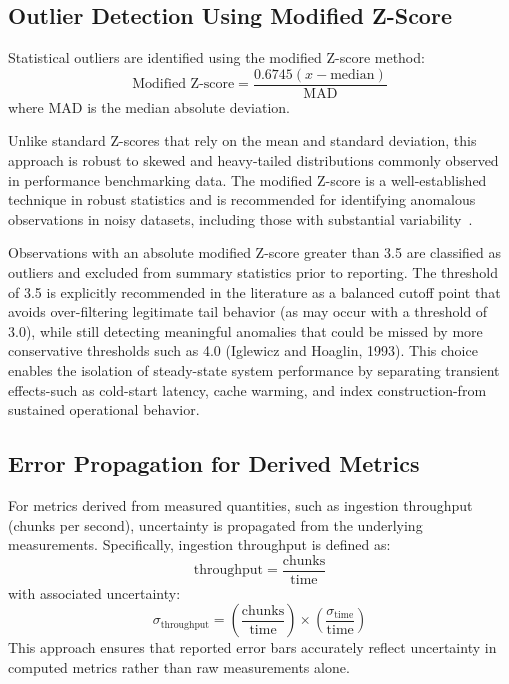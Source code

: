 \documentclass{article}
\begin{document}
\subsection{Outlier Detection Using Modified Z-Score}
Statistical outliers are identified using the modified Z-score method:
\begin{equation}
\text{Modified Z-score} = \frac{0.6745(x - \text{median})}{\text{MAD}}
\end{equation}
where MAD is the median absolute deviation.\

Unlike standard Z-scores that rely on the mean and standard deviation, this approach is robust to skewed and heavy-tailed distributions commonly observed in performance benchmarking data. The modified Z-score is a well-established technique in robust statistics and is recommended for identifying anomalous observations in noisy datasets, including those with substantial variability~\cite{iglewicz1993outliers}.


Observations with an absolute modified Z-score greater than 3.5 are classified as outliers and excluded from summary statistics prior to reporting. The threshold of 3.5 is explicitly recommended in the literature as a balanced cutoff point that avoids over-filtering legitimate tail behavior (as may occur with a threshold of 3.0), while still detecting meaningful anomalies that could be missed by more conservative thresholds such as 4.0 (Iglewicz and Hoaglin, 1993). This choice enables the isolation of steady-state system performance by separating transient effects-such as cold-start latency, cache warming, and index construction-from sustained operational behavior.

\subsection{Error Propagation for Derived Metrics}
For metrics derived from measured quantities, such as ingestion throughput (chunks per second), uncertainty is propagated from the underlying measurements. Specifically, ingestion throughput is defined as:
\begin{equation}
    \text{throughput} = \frac{\text{chunks}}{\text{time}}
\end{equation}
with associated uncertainty:
\begin{equation}    
    \sigma_{\text{throughput}} = \left(\frac{\text{chunks}}{\text{time}}\right) \times \left(\frac{\sigma_{\text{time}}}{\text{time}}\right)
\end{equation}
This approach ensures that reported error bars accurately reflect uncertainty in computed metrics rather than raw measurements alone.
\end{document}
